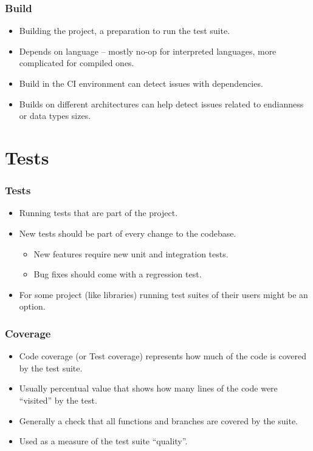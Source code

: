 \documentclass[aspectratio=169]{beamer}
\begin{document}
\begin{frame}
	\frametitle{Build}
	
	\begin{block}{}
		\begin{itemize}
			\item Building the project, a preparation to run the test suite.
			\item Depends on language -- mostly no-op for interpreted languages, more complicated for compiled ones.
			\item Build in the CI environment can detect issues with dependencies.
			\item Builds on different architectures can help detect issues related to endianness or data types sizes.
		\end{itemize}
	\end{block}
\end{frame}

\section{Tests}

\begin{frame}
	\frametitle{Tests}
	
	\begin{block}{}
		\begin{itemize}
			\item Running tests that are part of the project.
			\item  New tests should be part of every change to the codebase.
			\begin{itemize}
				\item New features require new unit and integration tests.
				\item Bug fixes should come with a regression test.
			\end{itemize}
			\item For some project (like libraries) running test suites of their users might be an option.
		\end{itemize}
	\end{block}
\end{frame}

\begin{frame}
	\frametitle{Coverage}
	
	\begin{block}{}
		\begin{itemize}
			\item Code coverage (or Test coverage) represents how much of the code is covered by the test suite.
			\item Usually percentual value that shows how many lines of the code were “visited” by the test.
			\item Generally a check that all functions and branches are covered by the suite.
			\item Used as a measure of the test suite “quality”.
		\end{itemize}
	\end{block}
\end{frame}
\end{document}
